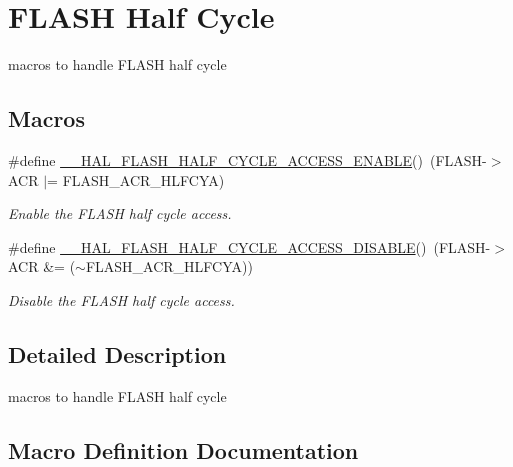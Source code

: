 \hypertarget{group___f_l_a_s_h___half___cycle}{}\section{F\+L\+A\+SH Half Cycle}
\label{group___f_l_a_s_h___half___cycle}


macros to handle F\+L\+A\+SH half cycle  


\subsection*{Macros}
\begin{DoxyCompactItemize}
\item 
\#define \hyperlink{group___f_l_a_s_h___half___cycle_ga65eb4c393cbc94747449b8aab349200a}{\+\_\+\+\_\+\+H\+A\+L\+\_\+\+F\+L\+A\+S\+H\+\_\+\+H\+A\+L\+F\+\_\+\+C\+Y\+C\+L\+E\+\_\+\+A\+C\+C\+E\+S\+S\+\_\+\+E\+N\+A\+B\+LE}()~(F\+L\+A\+SH-\/$>$A\+CR $\vert$= F\+L\+A\+S\+H\+\_\+\+A\+C\+R\+\_\+\+H\+L\+F\+C\+YA)
\begin{DoxyCompactList}\small\item\em Enable the F\+L\+A\+SH half cycle access. \end{DoxyCompactList}\item 
\#define \hyperlink{group___f_l_a_s_h___half___cycle_ga2e0c8e2c00a86896027c0cf1c95fbba1}{\+\_\+\+\_\+\+H\+A\+L\+\_\+\+F\+L\+A\+S\+H\+\_\+\+H\+A\+L\+F\+\_\+\+C\+Y\+C\+L\+E\+\_\+\+A\+C\+C\+E\+S\+S\+\_\+\+D\+I\+S\+A\+B\+LE}()~(F\+L\+A\+SH-\/$>$A\+CR \&= ($\sim$F\+L\+A\+S\+H\+\_\+\+A\+C\+R\+\_\+\+H\+L\+F\+C\+YA))
\begin{DoxyCompactList}\small\item\em Disable the F\+L\+A\+SH half cycle access. \end{DoxyCompactList}\end{DoxyCompactItemize}


\subsection{Detailed Description}
macros to handle F\+L\+A\+SH half cycle 



\subsection{Macro Definition Documentation}
\mbox{\label{group___f_l_a_s_h___half___cycle_ga2e0c8e2c00a86896027c0cf1c95fbba1}} 
